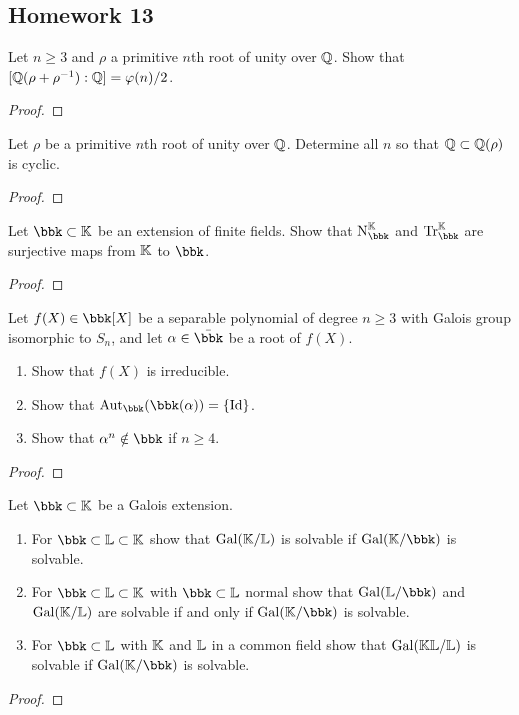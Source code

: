 \subsection{Homework 13}
\begin{problem}
Let $n\geq 3$ and $\rho$ a primitive $n$th root of unity over $\mathbb{Q}$. Show
that $[\mathbb{Q}(\rho+\rho^{-1}):\mathbb{Q}]=\varphi(n)/2$.
\end{problem}
\begin{proof}
\end{proof}

\begin{problem}
Let $\rho$ be a primitive $n$th root of unity over $\mathbb{Q}$. Determine all
$n$ so that $\mathbb{Q}\subset\mathbb{Q}(\rho)$ is cyclic.
\end{problem}
\begin{proof}
\end{proof}

\begin{problem}
  Let $\bbk\subset\bbK$ be an extension of finite fields. Show that
  $\Norm_\bbk^\bbK$ and $\Tr_\bbk^\bbK$ are surjective maps from $\mathbb{K}$ to
  $\bbk$.
\end{problem}
\begin{proof}
\end{proof}

\begin{problem}
  Let $f(X)\in\bbk[X]$ be a separable polynomial of degree $n\geq 3$ with
  Galois group isomorphic to $S_n$, and let $\alpha\in\bar\bbk$ be a root
  of $f(X)$.
  \begin{enumerate}[label=(\alph*),noitemsep]
  \item Show that $f(X)$ is irreducible.
  \item Show that $\Aut_\bbk(\bbk(\alpha))=\{\Id\}$.
  \item Show that $\alpha^n\notin\bbk$ if $n\geq 4$.
  \end{enumerate}
\end{problem}
\begin{proof}
\end{proof}

\begin{problem}
  Let $\bbk\subset\bbK$ be a Galois extension.
\begin{enumerate}[label=(\alph*),noitemsep]
\item For $\bbk\subset\bbL\subset\bbK$ show that $\operatorname{Gal}(\mathbb{K}/\mathbb{L})$ is
  solvable if $\Gal(\bbK/\bbk)$ is solvable.
\item For $\bbk\subset\bbL\subset\bbK$ with $\bbk\subset\bbL$ normal show
  that $\Gal(\bbL/\bbk)$ and $\operatorname{Gal}(\mathbb{K}/\mathbb{L})$ are solvable if and only if
  $\Gal(\bbK/\bbk)$ is solvable.
\item For $\bbk\subset\bbL$ with $\mathbb{K}$ and $\mathbb{L}$ in a common field show
  that $\operatorname{Gal}(\mathbb{K}\mathbb{L}/\mathbb{L})$ is solvable if $\Gal(\bbK/\bbk)$ is solvable.
\end{enumerate}
\end{problem}
\begin{proof}
\end{proof}

